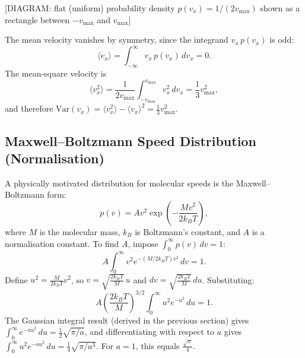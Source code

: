 \begin{center}[DIAGRAM: flat (uniform) probability density $p(v_x) = 1/(2v_{\max})$ shown as a rectangle between $-v_{\max}$ and $v_{\max}$]\end{center}

The mean velocity vanishes by symmetry, since the integrand $v_x\,p(v_x)$ is odd:
\begin{equation}
    \langle v_x \rangle = \int_{-\infty}^\infty v_x\,p(v_x)\,dv_x = 0.
\end{equation}
The mean-square velocity is
\begin{equation}
    \langle v_x^2 \rangle = \frac{1}{2v_{\max}}\int_{-v_{\max}}^{v_{\max}} v_x^2\,dv_x = \frac{1}{3}v_{\max}^2,
\end{equation}
and therefore $\mathrm{Var}(v_x) = \langle v_x^2\rangle - \langle v_x\rangle^2 = \tfrac{1}{3}v_{\max}^2$.

\subsection{Maxwell–Boltzmann Speed Distribution (Normalisation)}

A physically motivated distribution for molecular speeds is the Maxwell–Boltzmann form:
\begin{equation}
    p(v) = A v^2 \exp\!\left(-\frac{Mv^2}{2k_BT}\right),
\end{equation}
where $M$ is the molecular mass, $k_B$ is Boltzmann's constant, and $A$ is a normalisation constant. To find $A$, impose $\int_0^\infty p(v)\,dv = 1$:
\begin{equation}
    A\int_0^\infty v^2 e^{-(M/2k_BT)v^2}\,dv = 1.
\end{equation}
Define $u^2 = \tfrac{M}{2k_BT}v^2$, so $v = \sqrt{\tfrac{2k_BT}{M}}\,u$ and $dv = \sqrt{\tfrac{2k_BT}{M}}\,du$. Substituting:
\begin{equation}
    A\left(\frac{2k_BT}{M}\right)^{3/2}\int_0^\infty u^2 e^{-u^2}\,du = 1.
\end{equation}
The Gaussian integral result (derived in the previous section) gives $\int_0^\infty e^{-au^2}\,du = \tfrac{1}{2}\sqrt{\pi/a}$, and differentiating with respect to $a$ gives $\int_0^\infty u^2 e^{-au^2}\,du = \tfrac{1}{4}\sqrt{\pi/a^3}$. For $a = 1$, this equals $\tfrac{\sqrt{\pi}}{4}$.

